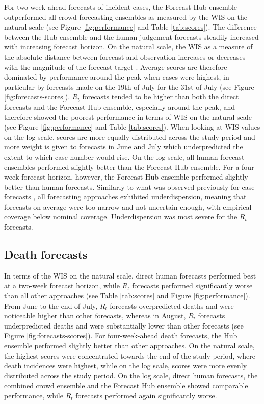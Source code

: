 \documentclass[10pt,a4paper,twocolumn]{article}
\begin{document}
For two-week-ahead-forecasts of incident cases, the Forecast Hub ensemble outperformed all crowd forecasting ensembles as measured by the WIS on the natural scale (see Figure \ref{fig:performance} and Table \ref{tab:scores}). The difference between the Hub ensemble and the human judgement forecasts steadily increased with increasing forecast horizon. On the natural scale, the WIS as a measure of the absolute distance between forecast and observation increases or decreases with the magnitude of the forecast target \cite{bosseTransformationForecastsEvaluating2023, bracherEvaluatingEpidemicForecasts2021}. Average scores are therefore dominated by performance around the peak when cases were highest, in particular by forecasts made on the 19th of July for the 31st of July (see Figure \ref{fig:forecasts-scores}). $R_t$ forecasts tended to be higher than both the direct forecasts and the Forecast Hub ensemble, especially around the peak, and therefore showed the poorest performance in terms of WIS on the natural scale (see Figure \ref{fig:performance} and Table \ref{tab:scores}). When looking at WIS values on the log scale,
scores are more equally distributed across the study period and more weight is given to forecasts in June and July which underpredicted the extent to which case number would rise. On the log scale, all human forecast ensembles performed slightly better than the Forecast Hub ensemble. For a four week forecast horizon, however, the Forecast Hub ensemble performed slightly better than human forecasts. Similarly to what was observed previously for case forecasts \citep{bosseComparingHumanModelbased2022, sherrattPredictivePerformanceMultimodel2022a}, all forecasting approaches exhibited underdispersion, meaning that forecasts on average were too narrow and not uncertain enough, with empirical coverage below nominal coverage. Underdispersion was most severe for the $R_t$ forecasts. 

\subsection*{Death forecasts} 



In terms of the WIS on the natural scale, direct human forecasts performed best at a two-week forecast horizon, while $R_t$ forecasts performed significantly worse than all other approaches (see Table \ref{tab:scores} and Figure \ref{fig:performance}). From June to the end of July, $R_t$ forecasts overpredicted deaths and were noticeable higher than other forecasts, whereas in August, $R_t$ forecasts underpredicted deaths and were substantially lower than other forecasts (see Figure \ref{fig:forecasts-scores}). For four-week-ahead death forecasts, the Hub ensemble performed slightly better than other approaches. 
On the natural scale, the highest scores were concentrated towards the end of the study period, where death incidences were highest, while on the log scale, scores were more evenly distributed across the study period. On the log scale, direct human forecasts, the combined crowd ensemble and the Forecast Hub ensemble showed comparable performance, while $R_t$ forecasts performed again significantly worse. 
 
\end{document}

